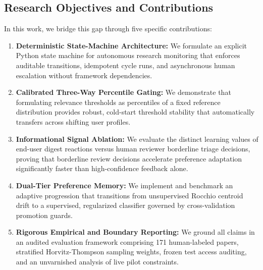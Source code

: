 \subsection{Research Objectives and Contributions}
\label{sec:contributions}

In this work, we bridge this gap through five specific contributions:
\begin{enumerate}
    \item \textbf{Deterministic State-Machine Architecture:} We formulate an explicit Python state machine for autonomous research monitoring that enforces auditable transitions, idempotent cycle runs, and asynchronous human escalation without framework dependencies.
    \item \textbf{Calibrated Three-Way Percentile Gating:} We demonstrate that formulating relevance thresholds as percentiles of a fixed reference distribution provides robust, cold-start threshold stability that automatically transfers across shifting user profiles.
    \item \textbf{Informational Signal Ablation:} We evaluate the distinct learning values of end-user digest reactions versus human reviewer borderline triage decisions, proving that borderline review decisions accelerate preference adaptation significantly faster than high-confidence feedback alone.
    \item \textbf{Dual-Tier Preference Memory:} We implement and benchmark an adaptive progression that transitions from unsupervised Rocchio centroid drift to a supervised, regularized classifier governed by cross-validation promotion guards.
    \item \textbf{Rigorous Empirical and Boundary Reporting:} We ground all claims in an audited evaluation framework comprising 171 human-labeled papers, stratified Horvitz-Thompson sampling weights, frozen test access auditing, and an unvarnished analysis of live pilot constraints.
\end{enumerate}
